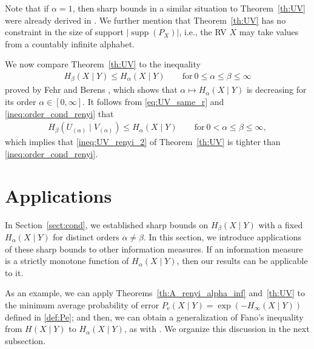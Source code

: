 \documentclass[conference, draftcls, onecolumn]{IEEEtran}
\theoremstyle{plain}
\newcommand{\supp}{\operatorname{supp}}
\newcommand{\thref}[1]{Theorem~\ref{#1}}
\newcommand{\sectref}[1]{Section~\ref{#1}}
\begin{document}
Note that if $\alpha = 1$, then sharp bounds in a similar situation to \thref{th:UV} were already derived in \cite[Theorem~2 and Corollary~1]{part2}.
We further mention that \thref{th:UV} has no constraint in the size of support $|\!\supp(P_{X})|$, i.e., the RV $X$ may take values from a countably infinite alphabet.

We now compare \thref{th:UV} to the inequality
\begin{align}
H_{\beta}(X \mid Y)
\le
H_{\alpha}(X \mid Y)
\qquad
\mathrm{for} \ 0 \le \alpha \le \beta \le \infty
\label{ineq:order_cond_renyi}
\end{align}
proved by Fehr and Berens \cite[Proposition~5]{fehr}, which shows that $\alpha \mapsto H_{\alpha}(X \mid Y)$ is decreasing for its order $\alpha \in [0, \infty]$.
It follows from \eqref{eq:UV_same_r} and \eqref{ineq:order_cond_renyi} that
\begin{align}
H_{\beta}(U_{(\alpha)} \mid V_{(\alpha)})
\le
H_{\alpha}(X \mid Y)
\qquad
\mathrm{for} \ 0 < \alpha \le \beta \le \infty ,
\end{align}
which implies that \eqref{ineq:UV_renyi_2} of \thref{th:UV} is tighter than \eqref{ineq:order_cond_renyi}.













\section{Applications}
\label{sect:appl}


In \sectref{sect:cond}, we established sharp bounds on $H_{\beta}(X \mid Y)$ with a fixed $H_{\alpha}(X \mid Y)$ for distinct orders $\alpha \neq \beta$.
In this section, we introduce applications of these sharp bounds to other information measures.
If an information measure is a strictly monotone function of $H_{\alpha}(X \mid Y)$, then our results can be applicable to it.

As an example, we can apply Theorems~\ref{th:A_renyi_alpha_inf} and~\ref{th:UV} to the minimum average probability of error
$P_{\mathrm{e}}(X \mid Y) = \exp( - H_{\infty}(X \mid Y) )$ defined in \eqref{def:Pe};
and then, we can obtain a generalization of Fano's inequality from $H(X \mid Y)$ to $H_{\alpha}(X \mid Y)$, as with \cite{sason}.
We organize this discussion in the next subsection.
\end{document}
